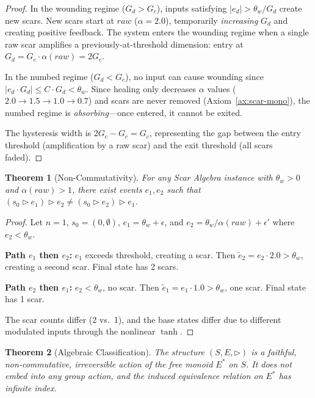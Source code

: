 \documentclass[11pt]{article}
\newtheorem{theorem}{Theorem}[section]
\begin{document}
\begin{proof}
In the wounding regime ($G_d > G_c$), inputs satisfying $|e_d| > \theta_w / G_d$ create new scars. New scars start at $raw$ ($\alpha = 2.0$), temporarily \emph{increasing} $G_d$ and creating positive feedback. The system enters the wounding regime when a single raw scar amplifies a previously-at-threshold dimension: entry at $G_d = G_c \cdot \alpha(raw) = 2G_c$.

In the numbed regime ($G_d < G_c$), no input can cause wounding since $|e_d \cdot G_d| \leq C \cdot G_d < \theta_w$. Since healing only decreases $\alpha$ values ($2.0 \to 1.5 \to 1.0 \to 0.7$) and scars are never removed (Axiom~\ref{ax:scar-mono}), the numbed regime is \emph{absorbing}---once entered, it cannot be exited.

The hysteresis width is $2G_c - G_c = G_c$, representing the gap between the entry threshold (amplification by a raw scar) and the exit threshold (all scars faded).
\end{proof}

\begin{theorem}[Non-Commutativity]
\label{thm:scar-noncommute}
For any Scar Algebra instance with $\theta_w > 0$ and $\alpha(raw) > 1$, there exist events $e_1, e_2$ such that $(s_0 \triangleright e_1) \triangleright e_2 \neq (s_0 \triangleright e_2) \triangleright e_1$.
\end{theorem}

\begin{proof}
Let $n=1$, $s_0 = (0, \emptyset)$, $e_1 = \theta_w + \epsilon$, and $e_2 = \theta_w / \alpha(raw) + \epsilon'$ where $e_2 < \theta_w$.

\textbf{Path $e_1$ then $e_2$:} $e_1$ exceeds threshold, creating a scar. Then $\tilde{e}_2 = e_2 \cdot 2.0 > \theta_w$, creating a second scar. Final state has 2 scars.

\textbf{Path $e_2$ then $e_1$:} $e_2 < \theta_w$, no scar. Then $\tilde{e}_1 = e_1 \cdot 1.0 > \theta_w$, one scar. Final state has 1 scar.

The scar counts differ (2 vs.\ 1), and the base states differ due to different modulated inputs through the nonlinear $\tanh$.
\end{proof}

\begin{theorem}[Algebraic Classification]
\label{thm:scar-algebra-class}
The structure $(S, E, \triangleright)$ is a faithful, non-commutative, irreversible action of the free monoid $E^*$ on $S$. It does not embed into any group action, and the induced equivalence relation on $E^*$ has infinite index.
\end{theorem}
\end{document}
